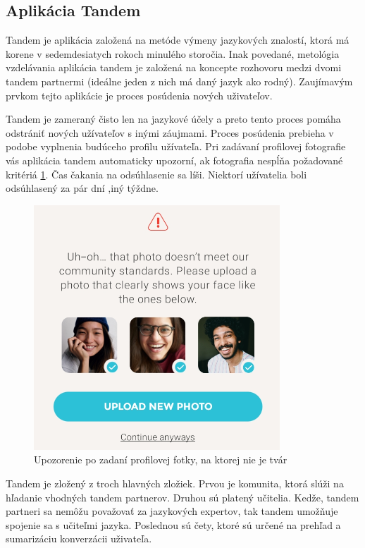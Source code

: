 \documentclass[10pt,oneside,slovak,a4paper]{article}
\begin{document}
\subsection{Aplikácia Tandem}
Tandem je aplikácia založená na metóde výmeny jazykových znalostí, ktorá má korene v sedemdesiatych rokoch minulého storočia. Inak povedané, metológia vzdelávania aplikácia tandem je založená na koncepte rozhovoru medzi dvomi tandem partnermi (ideálne jeden z nich má daný jazyk ako rodný).
Zaujímavým prvkom tejto aplikácie je proces posúdenia nových uživateľov.\cite{tandem}

 Tandem je zameraný čisto len na jazykové účely a preto tento proces pomáha odstrániť nových užívateľov s inými záujmami. Proces posúdenia prebieha v podobe vyplnenia budúceho profilu užívateľa. Pri zadávaní profilovej fotografie vás aplikácia tandem automaticky upozorní, ak fotografia nespĺňa požadované kritériá \ref{tandem-obmedzenia}. Čas čakania na odsúhlasenie sa líši. Niektorí užívatelia boli odsúhlasený za pár dní ,iný týždne.\\

\begin{figure}[h] %
\centering
\includegraphics{tandem2.png}
\caption{Upozorenie po zadaní profilovej fotky, na ktorej nie je tvár}
\label{tandem-obmedzenia}
\end{figure}

Tandem je zložený z troch hlavných zložiek. Prvou je komunita, ktorá slúži na hľadanie vhodných tandem partnerov. Druhou sú platený učitelia. Kedže, tandem partneri sa nemôžu považovať za jazykových expertov, tak tandem umožňuje spojenie sa s učiteľmi jazyka. Poslednou sú čety, ktoré sú určené na prehľad a sumarizáciu konverzácii uživateľa.
\\
\end{document}
